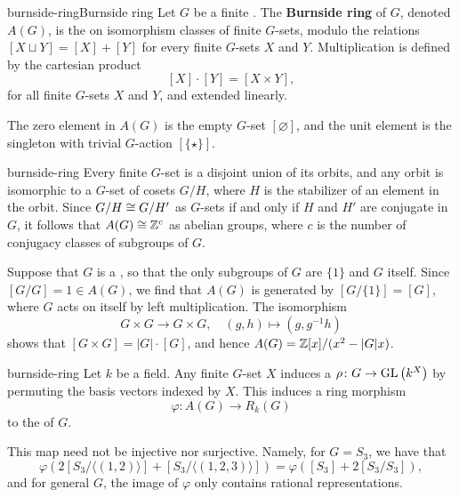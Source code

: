 \begin{topic}{burnside-ring}{Burnside ring}
    Let $G$ be a finite . The \textbf{Burnside ring} of $G$, denoted $A(G)$, is the  on isomorphism classes of finite $G$-sets, modulo the relations $[X \sqcup Y] = [X] + [Y]$ for every finite $G$-sets $X$ and $Y$. Multiplication is defined by the cartesian product
    \[ [X] \cdot [Y] = [X \times Y] , \]
    for all finite $G$-sets $X$ and $Y$, and extended linearly.
    
    The zero element in $A(G)$ is the empty $G$-set $[\varnothing]$, and the unit element is the singleton with trivial $G$-action $[\{ \star \}]$.
\end{topic}

\begin{example}{burnside-ring}
    Every finite $G$-set is a disjoint union of its orbits, and any orbit is isomorphic to a $G$-set of cosets $G/H$, where $H$ is the stabilizer of an element in the orbit. Since $G/H \cong G/H'$ as $G$-sets if and only if $H$ and $H'$ are conjugate in $G$, it follows that $A(G) \cong \mathbb{Z}^c$ as abelian groups, where $c$ is the number of conjugacy classes of subgroups of $G$.
    
    Suppose that $G$ is a , so that the only subgroups of $G$ are $\{ 1 \}$ and $G$ itself. Since $[G/G] = 1 \in A(G)$, we find that $A(G)$ is generated by $[G / \{ 1 \}] = [G]$, where $G$ acts on itself by left multiplication. The isomorphism
    \[ G \times G \to G \times G, \quad (g, h) \mapsto (g, g^{-1} h) \]
    shows that $[G \times G] = |G| \cdot [G]$, and hence $A(G) = \mathbb{Z}[x] / (x^2 - |G| x)$.
\end{example}

\begin{example}{burnside-ring}
    Let $k$ be a field. Any finite $G$-set $X$ induces a  $\rho \colon G \to \textup{GL}\left(k^X\right)$ by permuting the basis vectors indexed by $X$. This induces a ring morphism
    \[ \varphi \colon A(G) \to R_k(G) \]
    to the  of $G$.
    
    This map need not be injective nor surjective. Namely, for $G = S_3$, we have that
    \[ \varphi(2 [S_3 / \langle (1, 2) \rangle] + [S_3 / \langle (1, 2, 3) \rangle]) = \varphi([S_3] + 2 [S_3 / S_3]) , \]
    and for general $G$, the image of $\varphi$ only contains rational representations.
\end{example}

